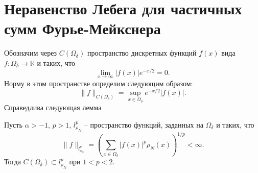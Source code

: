 \section{Неравенство Лебега для частичных сумм Фурье-Мейкснера}

Обозначим через $C(\Omega_\delta)$ пространство дискретных функций $f(x)$ вида $f:\Omega_\delta\rightarrow\mathbb{R}$ и таких, что
\begin{equation*}\label{cond}
\lim_{x\to\infty}|f(x)|e^{-x/2}=0.
\end{equation*}
Норму в этом пространстве определим следующим образом:
\begin{equation*}\label{norma}
\|f\|_{C(\Omega_\delta)}=\sup_{x\in\Omega_\delta}e^{-x/2}|f(x)|.
\end{equation*}
Справедлива следующая лемма


\begin{lemma}
Пусть $\alpha>-1$, $p>1$, $l_{\rho_N}^p$ -- пространство функций, заданных на $\Omega_\delta$ и таких, что
$$
\|f\|_{l_{\rho_N}^p}=\left(\sum_{x\in\Omega_\delta}|f(x)|^p\rho_N(x)\right)^{1/p}<\infty.
$$
Тогда $C(\Omega_\delta)\subset l_{\rho_N}^p$ при $1<p<2$.
\end{lemma}



